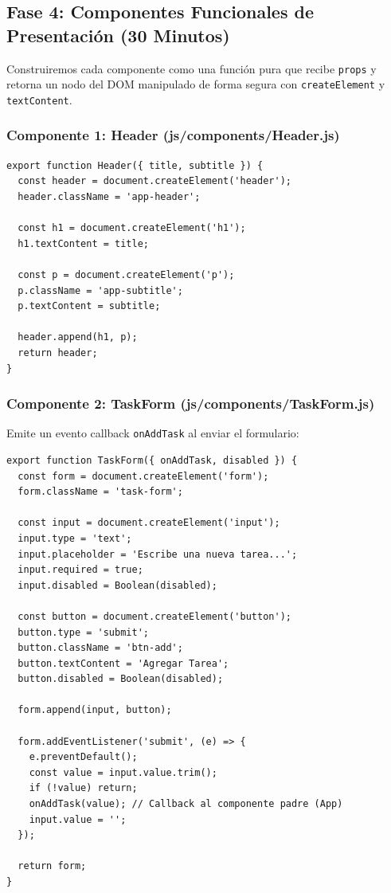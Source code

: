 \documentclass[10pt,letterpaper]{article}
\begin{document}
\subsection{Fase 4: Componentes Funcionales de Presentación (30 Minutos)}
Construiremos cada componente como una función pura que recibe \texttt{props} y retorna un nodo del DOM manipulado de forma segura con \texttt{createElement} y \texttt{textContent}.

\subsubsection{Componente 1: Header (js/components/Header.js)}
\begin{lstlisting}[style=jsstyle]
export function Header({ title, subtitle }) {
  const header = document.createElement('header');
  header.className = 'app-header';

  const h1 = document.createElement('h1');
  h1.textContent = title;

  const p = document.createElement('p');
  p.className = 'app-subtitle';
  p.textContent = subtitle;

  header.append(h1, p);
  return header;
}
\end{lstlisting}

\subsubsection{Componente 2: TaskForm (js/components/TaskForm.js)}
Emite un evento callback \texttt{onAddTask} al enviar el formulario:

\begin{lstlisting}[style=jsstyle]
export function TaskForm({ onAddTask, disabled }) {
  const form = document.createElement('form');
  form.className = 'task-form';

  const input = document.createElement('input');
  input.type = 'text';
  input.placeholder = 'Escribe una nueva tarea...';
  input.required = true;
  input.disabled = Boolean(disabled);

  const button = document.createElement('button');
  button.type = 'submit';
  button.className = 'btn-add';
  button.textContent = 'Agregar Tarea';
  button.disabled = Boolean(disabled);

  form.append(input, button);

  form.addEventListener('submit', (e) => {
    e.preventDefault();
    const value = input.value.trim();
    if (!value) return;
    onAddTask(value); // Callback al componente padre (App)
    input.value = '';
  });

  return form;
}
\end{lstlisting}
\end{document}
